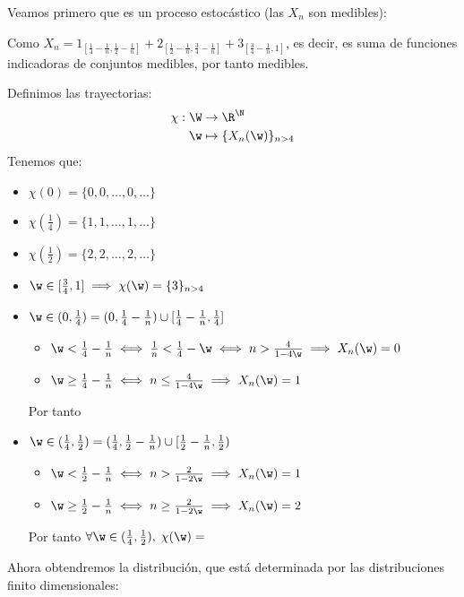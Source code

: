 \begin{sol}
  Veamos primero que es un proceso estocástico (las $X_n$ son medibles):

  Como $X_n = 1_{[\frac{1}{4} - \frac{1}{n}, \frac{1}{2} - \frac{1}{n}]} + 2_{[\frac{1}{2} - \frac{1}{n}, \frac{3}{4} - \frac{1}{n}]} + 3_{[\frac{3}{4} - \frac{1}{n}, 1]}$, es decir, es suma de funciones indicadoras de conjuntos medibles, por tanto medibles.

  Definimos las trayectorias:
  \begin{align*}
    \chi : \W & \to \R^\N \\
    \w & \mapsto \{X_n(\w)\}_{n>4}
  \end{align*}
  Tenemos que:
  \begin{itemize}
    \item $\chi(0) = \{0, 0, \ldots, 0, \ldots \}$
    \item $\chi(\frac{1}{4}) = \{1, 1, \ldots, 1, \ldots\}$
    \item $\chi(\frac{1}{2}) = \{2, 2, \ldots, 2, \ldots\}$
    \item $\w \in [\frac{3}{4}, 1] \implies \chi(\w) = \{3\}_{n>4}$
    \item $\w \in (0, \frac{1}{4}) = (0, \frac{1}{4} - \frac{1}{n}) \cup [\frac{1}{4} - \frac{1}{n}, \frac{1}{4}]$

      \begin{itemize}
        \item $\w < \frac{1}{4} - \frac{1}{n} \iff \frac{1}{n} < \frac{1}{4} - \w \iff n > \frac{4}{1 - 4\w} \implies X_n(\w) = 0$
        \item $\w \geq \frac{1}{4} - \frac{1}{n} \iff n \leq \frac{4}{1-4\w} \implies X_n(\w) = 1$
      \end{itemize}
    Por tanto

    \item $\w \in (\frac{1}{4}, \frac{1}{2}) = (\frac{1}{4}, \frac{1}{2}-\frac{1}{n}) \cup [\frac{1}{2} - \frac{1}{n}, \frac{1}{2})$
    \begin{itemize}
      \item $\w < \frac{1}{2} - \frac{1}{n} \iff n > \frac{2}{1 - 2\w} \implies X_n(\w) = 1$
      \item $\w \geq \frac{1}{2} - \frac{1}{n} \iff n \geq \frac{2}{1-2\w} \implies X_n(\w) = 2$
    \end{itemize}
    Por tanto $\forall \w \in (\frac{1}{4}, \frac{1}{2}), \; \chi(\w) = $
  \end{itemize}

  Ahora obtendremos la distribución, que está determinada por las distribuciones finito dimensionales:


\end{sol}
